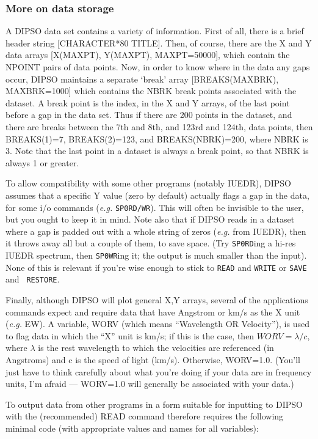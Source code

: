 \subsubsection {More on data storage}

A DIPSO data set contains a variety of information. First of all,
there is a brief header string [CHARACTER*80 TITLE]. Then, of course,
there are the X and Y data arrays [X(MAXPT), Y(MAXPT), MAXPT=50000],
which contain the NPOINT pairs of data points. Now, in order to know
where in the data any gaps occur, DIPSO maintains a separate `break'
array [BREAKS(MAXBRK), MAXBRK=1000] which contains the NBRK break
points associated with the dataset. A break point is the index, in the
X and Y arrays, of the last point before a gap in the data set. Thus
if there are 200 points in the dataset, and there are breaks between
the 7th and 8th, and 123rd and 124th, data points, then BREAKS(1)=7,
BREAKS(2)=123, and BREAKS(NBRK)=200, where NBRK is 3. Note that the
last point in a dataset is always a break point, so that NBRK is
always 1 or greater.

To allow compatibility with some other programs (notably IUEDR), DIPSO
assumes that a specific Y value (zero by default) actually flags a gap
in the data, for some i/o commands ({\em e.g.} {\tt SP0RD/WR}). This
will often be invisible to the user, but you ought to keep it in mind.
Note also that if DIPSO reads in a dataset where a gap is padded out
with a whole string of zeros ({\em e.g.} from IUEDR), then it throws
away all but a couple of them, to save space. (Try {\tt SP0RD}ing a
hi-res IUEDR spectrum, then {\tt SP0WR}ing it; the output is much
smaller than the input). None of this is relevant if you're wise
enough to stick to {\tt READ} and {\tt WRITE} or {\tt SAVE} and {\tt
RESTORE}.

Finally, although DIPSO will plot general X,Y arrays, several of the
applications commands expect and require data that have Angstrom or
km/s as the X unit ({\em e.g.} EW). A variable, WORV (which means
``Wavelength OR Velocity''), is used to flag data in which the ``X''
unit is km/s;  if this is the case, then $WORV=\lambda/c$, where
$\lambda$ is the rest wavelength to which the velocities are
referenced (in Angstroms) and c is the speed of light (km/s).
Otherwise, WORV=1.0. (You'll just have to think carefully about what
you're doing if your data are in frequency units, I'm afraid ---
WORV=1.0 will generally be associated with your data.)

To output data from other programs in a form suitable for inputting to
DIPSO with the (recommended) READ command therefore requires the
following minimal code (with appropriate values and names for all
variables):

